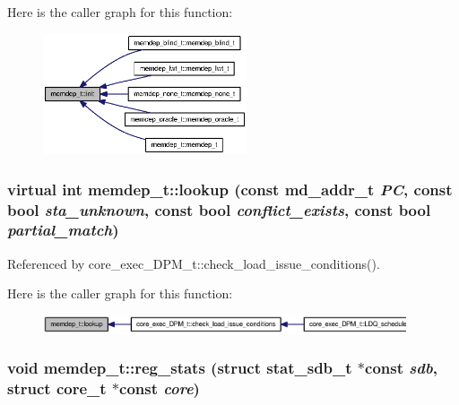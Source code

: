 Here is the caller graph for this function:\nopagebreak
\begin{figure}[H]
\begin{center}
\leavevmode
\includegraphics[width=170pt]{classmemdep__t_0419e6a5f42e4c85015147aae9f48ce8_icgraph}
\end{center}
\end{figure}
\subsubsection[{lookup}]{\setlength{\rightskip}{0pt plus 5cm}virtual int memdep\_\-t::lookup (const {\bf md\_\-addr\_\-t} {\em PC}, \/  const bool {\em sta\_\-unknown}, \/  const bool {\em conflict\_\-exists}, \/  const bool {\em partial\_\-match})\hspace{0.3cm}{\tt  [pure virtual]}}\label{classmemdep__t_4e942f2faba7dd4b7ed2d28b887723b0}




Referenced by core\_\-exec\_\-DPM\_\-t::check\_\-load\_\-issue\_\-conditions().

Here is the caller graph for this function:\nopagebreak
\begin{figure}[H]
\begin{center}
\leavevmode
\includegraphics[width=304pt]{classmemdep__t_4e942f2faba7dd4b7ed2d28b887723b0_icgraph}
\end{center}
\end{figure}
\subsubsection[{reg\_\-stats}]{\setlength{\rightskip}{0pt plus 5cm}void memdep\_\-t::reg\_\-stats (struct {\bf stat\_\-sdb\_\-t} $\ast$const {\em sdb}, \/  struct {\bf core\_\-t} $\ast$const {\em core})\hspace{0.3cm}{\tt  [virtual]}}\label{classmemdep__t_a1a98010c0e6d4008ae372469db6888b}





